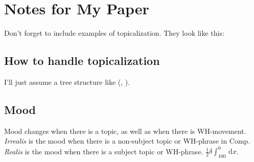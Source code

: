 \documentclass[12pt]{article}
\begin{document}
\section*{Notes for My Paper}

Don't forget to include examples of topicalization.
They look like this:

{\small
{}
}

\subsection*{How to handle topicalization}

I'll just assume a tree structure like (, ).

{\small
{}
}

\subsection*{Mood}

Mood changes when there is a topic, as well as when
there is WH-movement.  \emph{Irrealis} is the mood when
there is a non-subject topic or WH-phrase in Comp.
\emph{Realis} is the mood when there is a subject topic
or WH-phrase. $\frac{1}{2} \delta \int_{100}^{0}  \,\mathrm{d}x $.
\end{document}
